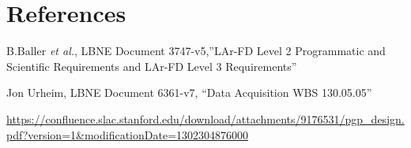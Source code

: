 
\section{References}

\begin{thebibliography}{99}

 B.Baller {\it et al.}, LBNE Document 3747-v5,''LAr-FD Level 2 Programmatic and
Scientific Requirements and LAr-FD Level 3 Requirements''

 Jon Urheim, LBNE Document 6361-v7, ``Data Acquisition WBS 130.05.05''

\url{https://confluence.slac.stanford.edu/download/attachments/9176531/pgp_design.pdf?version=1&modificationDate=1302304876000}
	               
\end{thebibliography} 
